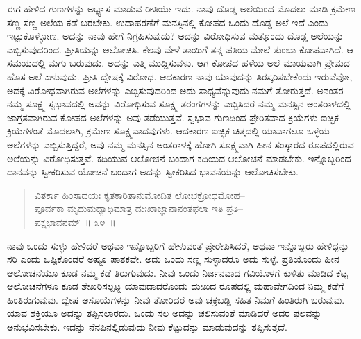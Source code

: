 ಈಗ ಹೇಳಿದ ಗುಣಗಳನ್ನು ಅಭ್ಯಾಸ ಮಾಡುವ ರೀತಿಯೇ ಇದು. ನಾವು ದೊಡ್ಡ ಅಲೆಯಿಂದ ಮೊದಲು ಮಾಡಿ ಕ್ರಮೇಣ ಸಣ್ಣ ಸಣ್ಣ ಅಲೆಯ ಕಡೆ ಬರಬೇಕು. ಉದಾಹರಣೆಗೆ ಮನಸ್ಸಿನಲ್ಲಿ ಕೋಪದ ಒಂದು ದೊಡ್ಡ ಅಲೆ ಇದೆ ಎಂದು ಇಟ್ಟುಕೊಳ್ಳೋಣ. ಅದನ್ನು ನಾವು ಹೇಗೆ ನಿಗ್ರಹಿಸುವುದು? ಅದನ್ನು ವಿರೋಧಿಸುವ ಮತ್ತೊಂದು ದೊಡ್ಡ ಅಲೆಯನ್ನು ಎಬ್ಬಿಸುವುದರಿಂದ. ಪ್ರೀತಿಯನ್ನು ಆಲೋಚಿಸಿ. ಕೆಲವು ವೇಳೆ ತಾಯಿಗೆ ತನ್ನ ಪತಿಯ ಮೇಲೆ ತುಂಬಾ ಕೋಪವಾಗಿದೆ. ಆ ಸಮಯದಲ್ಲಿ ಮಗು ಬರುವುದು. ಅದನ್ನು ಎತ್ತಿ ಮುದ್ದಿಸುವಳು. ಆಗ ಕೋಪದ ಹಳೆಯ ಅಲೆ ಮಾಯವಾಗಿ ಪ್ರೇಮದ ಹೊಸ ಅಲೆ ಏಳುವುದು. ಪ್ರೀತಿ ದ್ವೇಷಕ್ಕೆ ವಿರೋಧ. ಆದಕಾರಣ ನಾವು ಯಾವುದನ್ನು ತಿರಸ್ಕರಿಸಬೇಕೆಂದು ಇರುವೆವೋ, ಅದಕ್ಕೆ ವಿರೋಧವಾಗಿರುವ ಅಲೆಗಳನ್ನು ಎಬ್ಬಿಸುವುದರಿಂದ ಅದು ಸಾಧ್ಯವೆನ್ನುವುದು ನಮಗೆ ತೋರುತ್ತದೆ. ಅನಂತರ ನಮ್ಮ ಸೂಕ್ಷ್ಮ ಸ್ವಭಾವದಲ್ಲಿ ಅವನ್ನು ವಿರೋಧಿಸುವ ಸೂಕ್ಷ್ಮ ತರಂಗಗಳನ್ನು ಎಬ್ಬಿಸಿದರೆ ನಮ್ಮ ಮನಸ್ಸಿನ ಅಂತರಾಳದಲ್ಲಿ ಜಾಗ್ರತವಾಗಿರುವ ಕೋಪದ ಅಲೆಗಳನ್ನು ಅವು ತಡೆಯುತ್ತವೆ. ಸ್ವಭಾವ ಗುಣದಿಂದ ಪ್ರೇರಿತವಾದ ಕ್ರಿಯೆಗಳು ಐಚ್ಛಿಕ ಕ್ರಿಯೆಗಳಂತೆ ಮೊದಲಾಗಿ, ಕ್ರಮೇಣ ಸೂಕ್ಷ್ಮವಾದವುಗಳು. ಆದಕಾರಣ ಐಚ್ಛಿಕ ಚಿತ್ತದಲ್ಲಿ ಯಾವಾಗಲೂ ಒಳ್ಳೆಯ ಅಲೆಗಳನ್ನು ಎಬ್ಬಿಸುತ್ತಿದ್ದರೆ, ಅವು ನಮ್ಮ ಮನಸ್ಸಿನ ಅಂತರಾಳಕ್ಕೆ ಹೋಗಿ ಸೂಕ್ಷ್ಮವಾಗಿ ಹೀನ ಸಂಸ್ಕಾರದ ರೂಪದಲ್ಲಿರುವ ಅಲೆಯನ್ನು ವಿರೋಧಿಸುತ್ತವೆ. ಕದಿಯುವ ಆಲೋಚನೆ ಬಂದಾಗ ಕದಿಯದ ಆಲೋಚನೆ ಮಾಡಬೇಕು. ಇನ್ನೊಬ್ಬರಿಂದ ದಾನವನ್ನು ಸ್ವೀಕರಿಸುವ ಯೋಚನೆ ಬಂದಾಗ ಅದನ್ನು ಸ್ವೀಕರಿಸಿದ ಭಾವನೆಯನ್ನು ಆಲೋಚಿಸಬೇಕು. 

\vspace{-0.4cm}

\begin{verse}
ವಿತರ್ಕಾ ಹಿಂಸಾದಯಃ ಕೃತಕಾರಿತಾನುಮೋದಿತ ಲೋಭಕ್ರೋಧಮೋಹ–\\ಪೂರ್ವಕಾ ಮೃದುಮಧ್ಯಾಧಿಮಾತ್ರ ದುಃಖಾಜ್ಞಾನಾನಂತಫಲಾ ಇತಿ ಪ್ರತಿ–\\ಪಕ್ಷಭಾವನಮ್​~॥ ೩೪~॥
\end{verse}

\vspace{-0.5cm}


\vspace{0.1cm}

ನಾವು ಒಂದು ಸುಳ್ಳು ಹೇಳಿದರೆ ಅಥವಾ ಇನ್ನೊಬ್ಬರಿಗೆ ಹೇಳುವಂತೆ ಪ್ರೇರೇಪಿಸಿದರೆ, ಅಥವಾ ಇನ್ನೊಬ್ಬರು ಹೇಳಿದ್ದನ್ನು ಸರಿ ಎಂದು ಒಪ್ಪಿಕೊಂಡರೆ ಅಷ್ಟೂ ಪಾತಕವೇ. ಅದು ಒಂದು ಸಣ್ಣ ಸುಳ್ಳಾದರೂ ಅದು ಸುಳ್ಳೆ. ಪ್ರತಿಯೊಂದು ಹೀನ ಆಲೋಚನೆಯೂ ಕೂಡ ನಮ್ಮ ಕಡೆ ತಿರುಗುವುದು. ನೀವು ಒಂದು ನಿರ್ಜನವಾದ ಗವಿಯೊಳಗೆ ಕುಳಿತು ಮಾಡಿದ ಕೆಟ್ಟ ಆಲೋಚನೆಗಳೂ ಕೂಡ ಶೇಖರಿಸಲ್ಪಟ್ಟ ಯಾವುದಾದರೊಂದು ದುಃಖದ ರೂಪದಲ್ಲಿ ಮಹಾವೇಗದಿಂದ ನಿಮ್ಮ ಕಡೆಗೆ ಹಿಂತಿರುಗುವುವು. ದ್ವೇಷ ಅಸೂಯೆಗಳನ್ನು ನೀವು ತೋರಿದರೆ ಅವು ಚಕ್ರಬಡ್ಡಿ ಸಹಿತ ನಿಮಗೆ ಹಿಂತಿರುಗಿ ಬರುವುವು. ಯಾವ ಶಕ್ತಿಯೂ ಅದನ್ನು ತಪ್ಪಿಸಲಾರದು. ಒಂದು ಸಲ ಅದನ್ನು ಚಲಿಸುವಂತೆ ಮಾಡಿದರೆ ಅದರ ಫಲವನ್ನು ಅನುಭವಿಸಬೇಕು. ಇದನ್ನು ನೆನಪಿನಲ್ಲಿಡುವುದು ನೀವು ಕೆಟ್ಟುದನ್ನು ಮಾಡುವುದನ್ನು ತಪ್ಪಿಸುತ್ತದೆ. 

